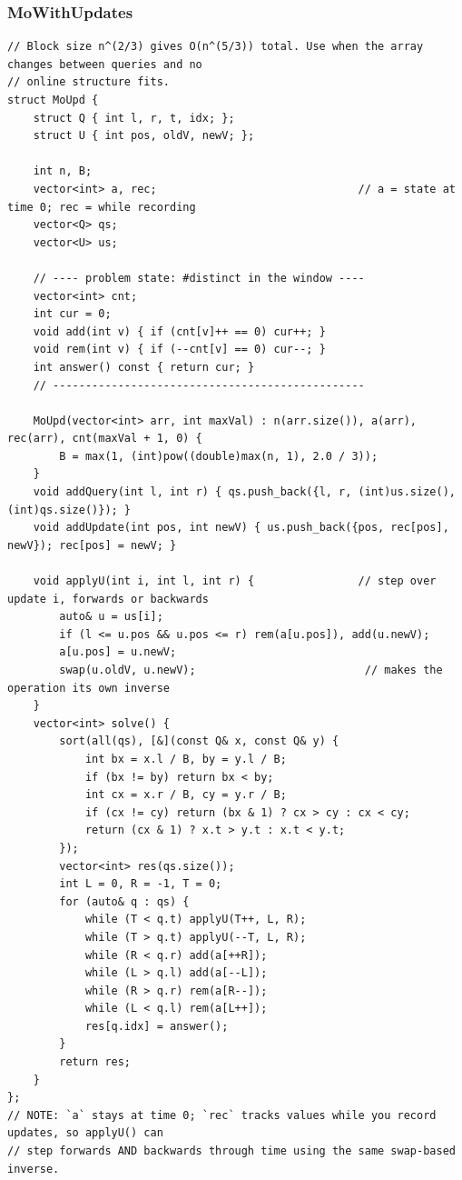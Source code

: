 \documentclass[9pt,a4paper,twocolumn]{extarticle}
\begin{document}
\filbreak
\subsubsection{MoWithUpdates}
\nopagebreak
\begin{lstlisting}
// Block size n^(2/3) gives O(n^(5/3)) total. Use when the array changes between queries and no
// online structure fits.
struct MoUpd {
    struct Q { int l, r, t, idx; };
    struct U { int pos, oldV, newV; };

    int n, B;
    vector<int> a, rec;                               // a = state at time 0; rec = while recording
    vector<Q> qs;
    vector<U> us;

    // ---- problem state: #distinct in the window ----
    vector<int> cnt;
    int cur = 0;
    void add(int v) { if (cnt[v]++ == 0) cur++; }
    void rem(int v) { if (--cnt[v] == 0) cur--; }
    int answer() const { return cur; }
    // ------------------------------------------------

    MoUpd(vector<int> arr, int maxVal) : n(arr.size()), a(arr), rec(arr), cnt(maxVal + 1, 0) {
        B = max(1, (int)pow((double)max(n, 1), 2.0 / 3));
    }
    void addQuery(int l, int r) { qs.push_back({l, r, (int)us.size(), (int)qs.size()}); }
    void addUpdate(int pos, int newV) { us.push_back({pos, rec[pos], newV}); rec[pos] = newV; }

    void applyU(int i, int l, int r) {                // step over update i, forwards or backwards
        auto& u = us[i];
        if (l <= u.pos && u.pos <= r) rem(a[u.pos]), add(u.newV);
        a[u.pos] = u.newV;
        swap(u.oldV, u.newV);                          // makes the operation its own inverse
    }
    vector<int> solve() {
        sort(all(qs), [&](const Q& x, const Q& y) {
            int bx = x.l / B, by = y.l / B;
            if (bx != by) return bx < by;
            int cx = x.r / B, cy = y.r / B;
            if (cx != cy) return (bx & 1) ? cx > cy : cx < cy;
            return (cx & 1) ? x.t > y.t : x.t < y.t;
        });
        vector<int> res(qs.size());
        int L = 0, R = -1, T = 0;
        for (auto& q : qs) {
            while (T < q.t) applyU(T++, L, R);
            while (T > q.t) applyU(--T, L, R);
            while (R < q.r) add(a[++R]);
            while (L > q.l) add(a[--L]);
            while (R > q.r) rem(a[R--]);
            while (L < q.l) rem(a[L++]);
            res[q.idx] = answer();
        }
        return res;
    }
};
// NOTE: `a` stays at time 0; `rec` tracks values while you record updates, so applyU() can
// step forwards AND backwards through time using the same swap-based inverse.
\end{lstlisting}
\end{document}
